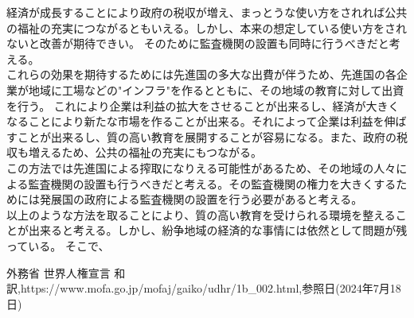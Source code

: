 \documentclass[a4paper,11pt]{jsarticle}
\begin{document}
経済が成長することにより政府の税収が増え、まっとうな使い方をされれば公共の福祉の充実につながるともいえる。しかし、本来の想定している使い方をされないと改善が期待できい。
そのために監査機関の設置も同時に行うべきだと考える。\\
これらの効果を期待するためには先進国の多大な出費が伴うため、先進国の各企業が地域に工場などの"インフラ"を作るとともに、その地域の教育に対して出資を行う。
これにより企業は利益の拡大をさせることが出来るし、経済が大きくなることにより新たな市場を作ることが出来る。それによって企業は利益を伸ばすことが出来るし、質の高い教育を展開することが容易になる。また、政府の税収も増えるため、公共の福祉の充実にもつながる。\\
この方法では先進国による搾取になりえる可能性があるため、その地域の人々による監査機関の設置も行うべきだと考える。その監査機関の権力を大きくするためには発展国の政府による監査機関の設置を行う必要があると考える。\\
以上のような方法を取ることにより、質の高い教育を受けられる環境を整えることが出来ると考える。しかし、紛争地域の経済的な事情には依然として問題が残っている。
そこで、

\begin{thebibliography}{99}
   外務省 世界人権宣言 和訳,https://www.mofa.go.jp/mofaj/gaiko/udhr/1b\_002.html,参照日(2024年7月18日)
\end{thebibliography}  
\end{document}
